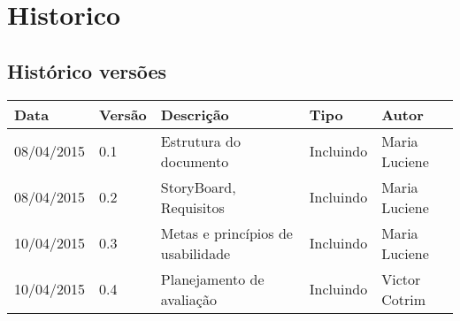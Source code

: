 \chapter[Historico]{Historico}

\section{Histórico versões}

\begin{table}[h]
	\centering
	\begin{tabular}{|l|l|l|l|l|}
		\hline
		Data & Versão & Descrição & Tipo & Autor \\ \hline
		08/04/2015 & 0.1 & Estrutura do documento & Incluindo & Maria Luciene \\ \hline
		08/04/2015 & 0.2 & StoryBoard, Requisitos & Incluindo & Maria Luciene \\ \hline
		10/04/2015 & 0.3 & Metas e princípios de usabilidade & Incluindo & Maria Luciene \\ \hline
		10/04/2015 & 0.4 & Planejamento de avaliação & Incluindo & Victor Cotrim \\ \hline	
	\end{tabular}
\end{table}

